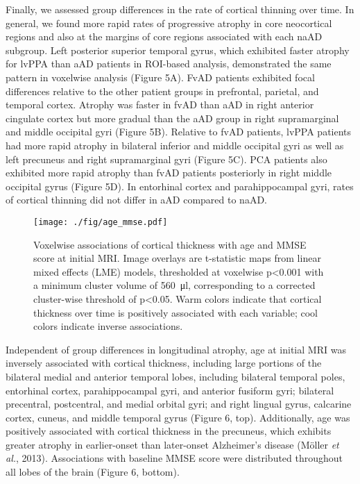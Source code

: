 \documentclass[]{article}
\begin{document}
Finally, we assessed group differences in the rate of cortical thinning
over time. In general, we found more rapid rates of progressive atrophy
in core neocortical regions and also at the margins of core regions
associated with each naAD subgroup. Left posterior superior temporal
gyrus, which exhibited faster atrophy for lvPPA than aAD patients in
ROI-based analysis, demonstrated the same pattern in voxelwise analysis
(Figure 5A). FvAD patients exhibited focal differences relative to the
other patient groups in prefrontal, parietal, and temporal cortex.
Atrophy was faster in fvAD than aAD in right anterior cingulate cortex
but more gradual than the aAD group in right supramarginal and middle
occipital gyri (Figure 5B). Relative to fvAD patients, lvPPA patients
had more rapid atrophy in bilateral inferior and middle occipital gyri
as well as left precuneus and right supramarginal gyri (Figure 5C). PCA
patients also exhibited more rapid atrophy than fvAD patients
posteriorly in right middle occipital gyrus (Figure 5D). In entorhinal
cortex and parahippocampal gyri, rates of cortical thinning did not
differ in aAD compared to naAD.

\begin{figure}[]

{\centering \texttt{[image: ./fig/age\_mmse.pdf]} 

}

\caption[Age and global cognition associations]{Voxelwise associations of cortical thickness with age and MMSE score at initial MRI. Image overlays are t-statistic maps from linear mixed effects (LME) models, thresholded at voxelwise p<0.001 with a minimum cluster volume of \SI{560}{\micro\litre}, corresponding to a corrected cluster-wise threshold of p<0.05. Warm colors indicate that cortical thickness over time is positively associated with each variable; cool colors indicate inverse associations. \label{age_mmse}}

\end{figure}

Independent of group differences in longitudinal atrophy, age at initial
MRI was inversely associated with cortical thickness, including large
portions of the bilateral medial and anterior temporal lobes, including
bilateral temporal poles, entorhinal cortex, parahippocampal gyri, and
anterior fusiform gyri; bilateral precentral, postcentral, and medial
orbital gyri; and right lingual gyrus, calcarine cortex, cuneus, and
middle temporal gyrus (Figure 6, top). Additionally, age was positively
associated with cortical thickness in the precuneus, which exhibits
greater atrophy in earlier-onset than later-onset Alzheimer's disease
(Möller \emph{et al.}, 2013). Associations with baseline MMSE score were
distributed throughout all lobes of the brain (Figure 6, bottom).
\end{document}
